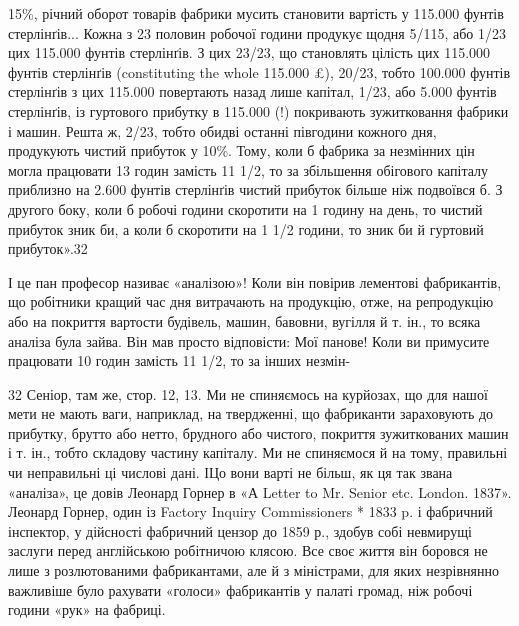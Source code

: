 15\%, річний оборот товарів фабрики мусить становити вартість у 115.000 фунтів стерлінґів... Кожна з
23 половин робочої години продукує щодня 5/115, або 1/23 цих 115.000 фунтів стерлінґів. З цих 23/23,
що становлять цілість цих 115.000 фунтів стерлінґів (constituting the whole 115.000 £), 20/23, тобто
100.000 фунтів стерлінґів з цих 115.000 повертають назад лише капітал, 1/23, або 5.000 фунтів
стерлінґів, із гуртового прибутку в 115.000 (!) покривають зужитковання фабрики і машин. Решта ж,
2/23, тобто обидві останні півгодини кожного дня, продукують чистий прибуток
у 10\%. Тому, коли б фабрика за незмінних цін могла працювати 13 годин замість 11 1/2, то за
збільшення обігового
капіталу приблизно на 2.600 фунтів стерлінґів чистий прибуток більше ніж подвоївся б. З другого
боку, коли б робочі години скоротити на 1 годину на день, то чистий прибуток зник би, а коли б
скоротити на 1 1/2 години, то зник би й гуртовий прибуток».32

І це пан професор називає «аналізою»! Коли він повірив лементові фабрикантів, що робітники кращий
час дня витрачають
на продукцію, отже, на репродукцію або на покриття вартости будівель, машин, бавовни, вугілля й т.
ін., то всяка аналіза
була зайва. Він мав просто відповісти: Мої панове! Коли ви примусите працювати 10 годин замість 11
1/2, то за інших незмін-

32    Сеніор, там же, стор. 12, 13. Ми не спиняємось на курйозах, що для нашої мети не мають ваги,
наприклад, на твердженні, що фабриканти зараховують до прибутку, брутто або нетто, брудного або
чистого, покриття зужиткованих машин і т. ін., тобто складову частину капіталу. Ми не
спиняємося й на тому, правильні чи неправильні ці числові дані. ІЦо вони
варті не більш, як ця так звана «аналіза», це довів Леонард Горнер в «А Letter to Mr. Senior etc.
London. 1837». Леонард Горнер, один із Factory Inquiry Commissioners * 1833 p. і фабричний
інспектор, у дійсності
фабричний цензор до 1859 р., здобув собі невмирущі заслуги перед англійською робітничою клясою. Все
своє життя він боровся не лише з розлютованими фабрикантами, але й з міністрами, для яких
незрівнянно важливіше було рахувати «голоси» фабрикантів у палаті громад, ніж
робочі години «рук» на фабриці.

